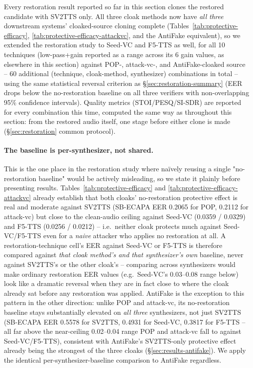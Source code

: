 \documentclass[11pt]{article}
\begin{document}
Every restoration result reported so far in this section clones the
restored candidate with SV2TTS only. All three cloak methods now have
\emph{all three} downstream systems' cloaked-source cloning complete
(Tables~\ref{tab:protective-efficacy}, \ref{tab:protective-efficacy-attackvc},
and the AntiFake equivalent), so we extended the restoration study to
Seed-VC and F5-TTS as well, for all 10 techniques (low-pass+gain
reported as a range across its 6 gain values, as elsewhere in this
section) against POP-, attack-vc-, and AntiFake-cloaked source -- 60
additional (technique, cloak-method, synthesizer) combinations in total
-- using the same statistical reversal criterion as
\S\ref{sec:restoration-summary} (EER drops below the no-restoration
baseline on all three verifiers with non-overlapping 95\% confidence
intervals). Quality metrics (STOI/PESQ/SI-SDR) are reported for every
combination this time, computed the same way as throughout this
section: from the restored audio itself, one stage before either clone
is made (\S\ref{sec:restoration} common protocol).

\paragraph{The baseline is per-synthesizer, not shared.} This is the
one place in the restoration study where na\"ively reusing a single
"no-restoration baseline" would be actively misleading, so we state it
plainly before presenting results. Tables~\ref{tab:protective-efficacy}
and \ref{tab:protective-efficacy-attackvc} already establish that both
cloaks' no-restoration protective effect is real and moderate against
SV2TTS (SB-ECAPA EER 0.2065 for POP, 0.2112 for attack-vc) but close to
the clean-audio ceiling against Seed-VC (0.0359 / 0.0329) and F5-TTS
(0.0256 / 0.0212) -- i.e.\ neither cloak protects much against
Seed-VC/F5-TTS even for a \emph{naive} attacker who applies no
restoration at all. A restoration-technique cell's EER against Seed-VC
or F5-TTS is therefore compared against \emph{that cloak method's and
that synthesizer's own} baseline, never against SV2TTS's or the other
cloak's -- comparing across synthesizers would make ordinary
restoration EER values (e.g.\ Seed-VC's 0.03--0.08 range below) look
like a dramatic reversal when they are in fact close to where the cloak
already sat before any restoration was applied. AntiFake is the
exception to this pattern in the other direction: unlike POP and
attack-vc, its no-restoration baseline stays substantially elevated on
\emph{all three} synthesizers, not just SV2TTS (SB-ECAPA EER 0.5578 for
SV2TTS, 0.4931 for Seed-VC, 0.3817 for F5-TTS -- all far above the
near-ceiling 0.02--0.04 range POP and attack-vc fall to against
Seed-VC/F5-TTS), consistent with AntiFake's SV2TTS-only protective
effect already being the strongest of the three cloaks
(\S\ref{sec:results-antifake}). We apply the identical
per-synthesizer-baseline comparison to AntiFake regardless.
\end{document}
